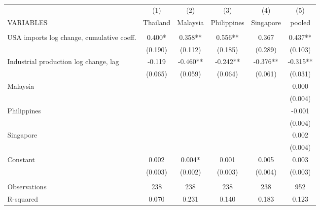 \begin{tabular}{lccccc} \hline
 & (1) & (2) & (3) & (4) & (5) \\
VARIABLES & Thailand & Malaysia & Philippines & Singapore & pooled \\ \hline
 &  &  &  &  &  \\
USA imports log change, cumulative coeff.  & 0.400* & 0.358** & 0.556** & 0.367 & 0.437** \\
 & (0.190) & (0.112) & (0.185) & (0.289) & (0.103) \\
Industrial production log change, lag & -0.119 & -0.460** & -0.242** & -0.376** & -0.315** \\
 & (0.065) & (0.059) & (0.064) & (0.061) & (0.031) \\
Malaysia &  &  &  &  & 0.000 \\
 &  &  &  &  & (0.004) \\
Philippines &  &  &  &  & -0.001 \\
 &  &  &  &  & (0.004) \\
Singapore &  &  &  &  & 0.002 \\
 &  &  &  &  & (0.004) \\
Constant & 0.002 & 0.004* & 0.001 & 0.005 & 0.003 \\
 & (0.003) & (0.002) & (0.003) & (0.004) & (0.003) \\
 &  &  &  &  &  \\
Observations & 238 & 238 & 238 & 238 & 952 \\
 R-squared & 0.070 & 0.231 & 0.140 & 0.183 & 0.123 \\ \hline
\end{tabular}
